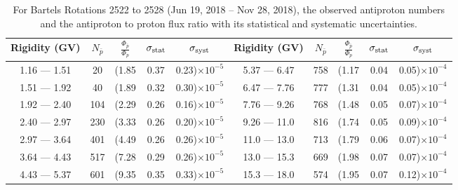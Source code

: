 \begin{table}[p] 
\renewcommand\baselinestretch{1.3}\selectfont
\setlength\tabcolsep{3pt}
\centering
\begin{tabular}{ccccc | ccccc}
\hline
\textbf{Rigidity}  (GV)  & $N_{\bar{p}}$ & $\frac{\Phi_{\bar{p}}}{\Phi_{p}}$ & $\sigma_{\rm{stat}}$ & $\sigma_{\rm{syst}}$ \hspace{1cm}   & \textbf{Rigidity}  (GV)  & $N_{\bar{p}}$ & $\frac{\Phi_{\bar{p}}}{\Phi_{p}}$ & $\sigma_{\rm{stat}}$ & $\sigma_{\rm{syst}}$ \hspace{1cm} \\ 
\hline
1.16 — 1.51   &  20                  &(1.85                          &  0.37              &      0.23)$\times 10^{-5}$  & 5.37 — 6.47                &  758                    &(1.17                                &  0.04                   &      0.05)$\times 10^{-4}$\\
1.51 — 1.92   &  40                  &(1.89                          &  0.32              &      0.30)$\times 10^{-5}$  & 6.47 — 7.76                &  777                    &(1.31                                &  0.04                   &      0.05)$\times 10^{-4}$\\
1.92 — 2.40   &  104                &(2.29                          &  0.26              &      0.16)$\times 10^{-5}$  & 7.76 — 9.26                &  768                    &(1.48                                &  0.05                   &      0.07)$\times 10^{-4}$\\    
2.40 — 2.97   &  230                &(3.33                          &  0.26              &      0.20)$\times 10^{-5}$  & 9.26 — 11.0                &  816                    &(1.74                                &  0.05                   &      0.09)$\times 10^{-4}$\\    
2.97 — 3.64   &  401                &(4.49                          &  0.26              &      0.26)$\times 10^{-5}$  & 11.0 — 13.0                 &  713                    &(1.79                                &  0.06                   &      0.07)$\times 10^{-4}$\\
3.64 — 4.43   &  517                &(7.28                          &  0.29              &      0.26)$\times 10^{-5}$  & 13.0 — 15.3               &  669                    &(1.98                                &  0.07                   &      0.07)$\times 10^{-4}$\\
4.43 — 5.37   &  601                &(9.35                          &  0.35              &      0.33)$\times 10^{-5}$  & 15.3 — 18.0               &  574                    &(1.95                                &  0.07                   &      0.12)$\times 10^{-4}$\\
\hline
\end{tabular}
\caption[Antiproton to proton flux ratio for Bartels Rotations 2522 to 2528]{For Bartels Rotations 2522 to 2528 (Jun 19, 2018 – Nov 28, 2018), the observed antiproton numbers and the antiproton to proton flux ratio with its statistical and systematic uncertainties.}
\label{TableOfDependent17}
\end{table}

